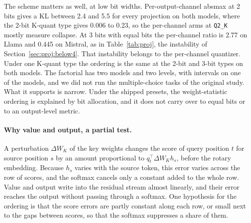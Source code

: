 \documentclass[journal]{IEEEtran}
\begin{document}
The scheme matters as well, at low bit widths. Per-output-channel absmax at 2 bits gives a KL
between 2.4 and 5.5 for every projection on both models, where the 2-bit K-quant type gives 0.006
to 0.23, so the per-channel arms at \texttt{Q2\_K} mostly measure collapse. At 3 bits with equal
bits the per-channel ratio is 2.77 on Llama and 0.445 on Mistral, as in
Table~\ref{tab:proj}, the instability of Section~\ref{sec:proj:below4}. That instability
belongs to the per-channel quantizer. Under one K-quant type the ordering is the same at the
2-bit and 3-bit types on both models. The factorial has two models and two
levels, with intervals on one of the models, and we did not run the multiple-choice tasks of the original study. What
it supports is narrow. Under the shipped presets, the weight-statistic ordering is explained by
bit allocation, and it does not carry over to equal bits or to an output-level metric.

\paragraph{Why value and output, a partial test.} A perturbation $\Delta W_K$ of the key weights
changes the score of query position $t$ for source position $s$ by an amount proportional to
$q_t^\top \Delta W_K h_s$, before the rotary embedding. Because $h_s$ varies with the source
token, this error varies across the row of scores, and the softmax cancels only a constant
added to the whole row. Value and output write into the residual stream almost linearly, and
their error reaches the output without passing through a softmax. One hypothesis for the
ordering is that the score errors are partly constant along each row, or small next to the gaps
between scores, so that the softmax suppresses a share of them.
\end{document}
